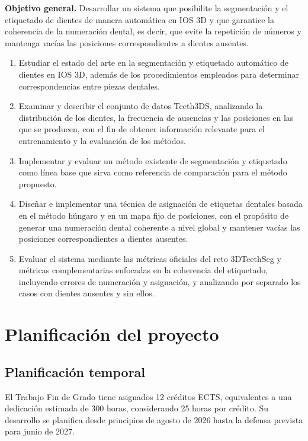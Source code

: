 \textbf{Objetivo general.} Desarrollar un sistema que posibilite la segmentación y el etiquetado de dientes de manera automática en IOS 3D y que garantice la coherencia de la numeración dental, es decir, que evite la repetición de números y mantenga vacías las posiciones correspondientes a dientes ausentes.

\begin{enumerate}[label=\textbf{OE\arabic*.}]
    \item Estudiar el estado del arte en la segmentación y etiquetado automático de dientes en IOS 3D, además de los procedimientos empleados para determinar correspondencias entre piezas dentales.
    \item Examinar y describir el conjunto de datos Teeth3DS, analizando la distribución de los dientes, la frecuencia de ausencias y las posiciones en las que se producen, con el fin de obtener información relevante para el entrenamiento y la evaluación de los métodos.
    \item Implementar y evaluar un método existente de segmentación y etiquetado como línea base que sirva como referencia de comparación para el método propuesto.
    \item Diseñar e implementar una técnica de asignación de etiquetas dentales basada en el método húngaro y en un mapa fijo de posiciones, con el propósito de generar una numeración dental coherente a nivel global y mantener vacías las posiciones correspondientes a dientes ausentes.
    \item Evaluar el sistema mediante las métricas oficiales del reto 3DTeethSeg y métricas complementarias enfocadas en la coherencia del etiquetado, incluyendo errores de numeración y asignación, y analizando por separado los casos con dientes ausentes y sin ellos.
\end{enumerate}

\section{Planificación del proyecto}
\label{sec:planificacion}

\subsection{Planificación temporal}
\label{subsec:planificacion-temporal}

El Trabajo Fin de Grado tiene asignados 12 créditos ECTS, equivalentes a una dedicación estimada de 300 horas, considerando 25 horas por crédito. Su desarrollo se planifica desde principios de agosto de 2026 hasta la defensa prevista para junio de 2027.

